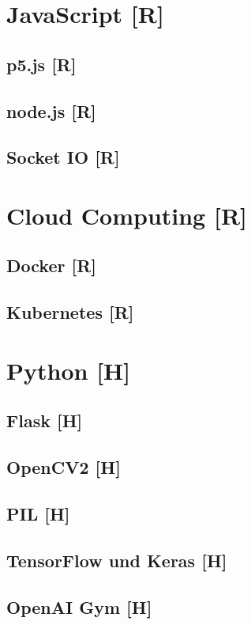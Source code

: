 
\section{JavaScript [R]}
\subsection{p5.js [R]}
\subsection {node.js [R]}
\subsection{Socket IO [R]}

\section{Cloud Computing [R]}
\subsection{Docker [R]}
\subsection{Kubernetes [R]}


\section{Python [H]}

\subsection{Flask [H]}

\subsection{OpenCV2 [H]}

\subsection{PIL [H]}

\subsection{TensorFlow und Keras [H]}

\subsection{OpenAI Gym [H]}

